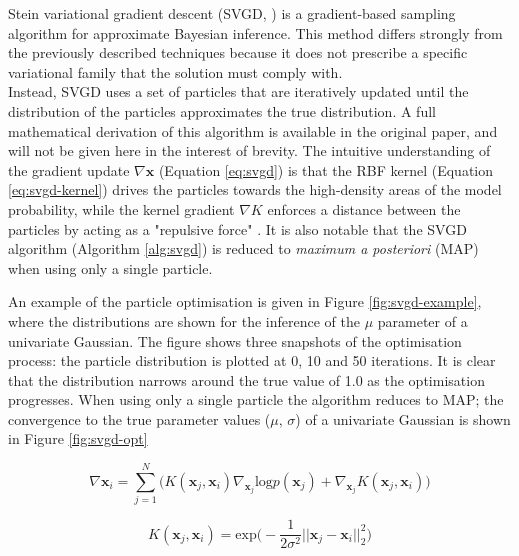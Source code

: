 \par Stein variational gradient descent (SVGD, \cite{SVGD}) is a gradient-based sampling algorithm for approximate Bayesian inference. This method differs strongly from the previously described techniques because it does not prescribe a specific variational family that the solution must comply with.
\\
Instead, SVGD uses a set of particles that are iteratively updated until the distribution of the particles approximates the true distribution. A full mathematical derivation of this algorithm is available in the original paper, and will not be given here in the interest of brevity. The intuitive understanding of the gradient update $\nabla\bm x$ (Equation \ref{eq:svgd}) is that the RBF kernel  (Equation \ref{eq:svgd-kernel}) drives the particles towards the high-density areas of the model probability, while the kernel gradient $\nabla K$ enforces a distance between the particles by acting as a "repulsive force" \parencite{SVGD}. It is also notable that the SVGD algorithm (Algorithm \ref{alg:svgd}) is reduced to \textit{maximum a posteriori} (MAP) when using only a single particle.
\medskip
\par An example of the particle optimisation is given in Figure \ref{fig:svgd-example}, where the distributions are shown for the inference of the $\mu$ parameter of a univariate Gaussian. The figure shows three snapshots of the optimisation process: the particle distribution is plotted at 0, 10 and 50 iterations. It is clear that the distribution narrows around the true value of 1.0 as the optimisation progresses. When using only a single particle the algorithm reduces to MAP; the convergence to the true parameter values ($\mu, \,\sigma$) of a univariate Gaussian is shown in Figure \ref{fig:svgd-opt}

\begin{equation}
    \label{eq:svgd}
    \nabla \bm{x}_i =  \sum^N_{j=1} \Big( K(\bm{x}_j, \bm{x}_i) \nabla_{\bm{x}_j}{\mathrm{log}p(\bm{x}_j)} 
    + \nabla_{\bm{x}_j} K(\bm{x}_j, \bm{x}_i) \Big)
\end{equation}

\begin{equation}
    \label{eq:svgd-kernel}
    K(\bm{x}_j, \bm{x}_i) = \mathrm{exp} \Big( -\frac{1}{2\sigma^2} ||\bm{x}_j - \bm{x}_i||^2_2 \Big)
\end{equation}

